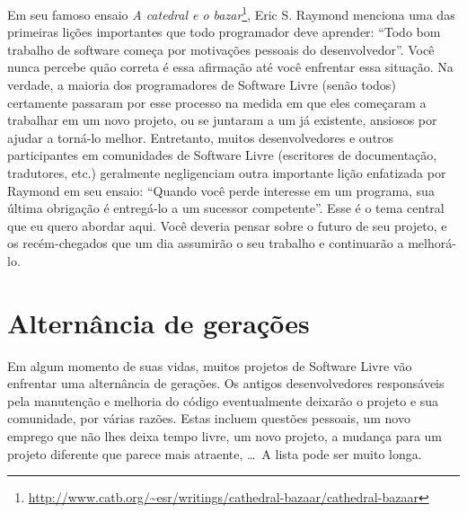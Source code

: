 

\noindent{}Em seu famoso ensaio \textit{A catedral e o bazar}\footnote{\url{
http://www.catb.org/~esr/writings/cathedral-bazaar/cathedral-bazaar}}, Eric S.
Raymond menciona uma das primeiras lições importantes que todo programador 
deve aprender: ``Todo bom trabalho de software começa por motivações pessoais 
do desenvolvedor''. Você nunca percebe quão correta é essa afirmação até você
enfrentar essa situação. Na verdade, a maioria dos programadores de Software Livre
(senão todos) certamente passaram por esse processo na medida em que eles começaram
a trabalhar em um novo projeto, ou se juntaram a um já existente, ansiosos por ajudar
a torná-lo melhor. Entretanto, muitos desenvolvedores e outros participantes em 
comunidades de Software Livre (escritores de documentação, tradutores, etc.) geralmente
negligenciam outra importante lição enfatizada por Raymond em seu ensaio: ``Quando você perde
interesse em um programa, sua última obrigação é entregá-lo a um sucessor competente''.
Esse é o tema central que eu quero abordar aqui. Você deveria pensar sobre o futuro
de seu projeto, e os recém-chegados que um dia assumirão o seu trabalho e continuarão
a melhorá-lo.

\section*{Alternância de gerações}

Em algum momento de suas vidas, muitos projetos de Software Livre vão enfrentar
uma alternância de gerações. Os antigos desenvolvedores responsáveis pela manutenção
e melhoria do código eventualmente deixarão o projeto e sua comunidade, por várias razões.
Estas incluem questões pessoais, um novo emprego que não lhes deixa tempo livre, um novo projeto,
a mudança para um projeto diferente que parece mais atraente, \dots\ A lista pode ser muito longa.

